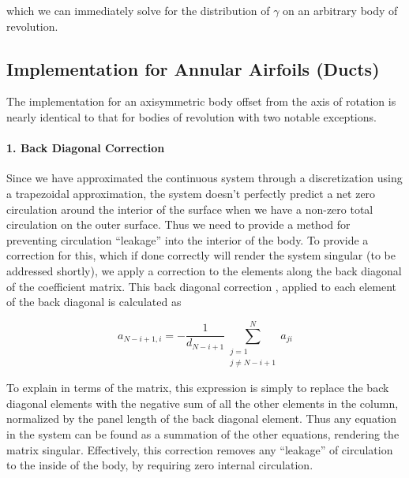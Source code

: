 \noindent which we can immediately solve for the distribution of \(\gamma\) on an arbitrary body of revolution.

\subsection{Implementation for Annular Airfoils (Ducts)}

The implementation for an axisymmetric body offset from the axis of rotation is nearly identical to that for bodies of revolution with two notable exceptions.

\paragraph{1. Back Diagonal Correction}

Since we have approximated the continuous system through a discretization using a trapezoidal approximation, the system doesn't perfectly predict a net zero circulation around the interior of the surface when we have a non-zero total circulation on the outer surface.
Thus we need to provide a method for preventing circulation ``leakage'' into the interior of the body.
To provide a correction for this, which if done correctly will render the system singular (to be addressed shortly), we apply a correction to the elements along the back diagonal of the coefficient matrix.
This back diagonal correction \cite{Lewis_1991}, applied to each element of the back diagonal is calculated as

\begin{equation}
	a_{N-i+1,i} = - \frac{1}{d_{N-i+1}} \sum\limits^N_{\substack{j=1\\ j\neq N-i+1}} a_{ji}
\end{equation}

\noindent To explain in terms of the matrix, this expression is simply to replace the back diagonal elements with the negative sum of all the other elements in the column, normalized by the panel length of the back diagonal element.
Thus any equation in the system can be found as a summation of the other equations, rendering the matrix singular.
Effectively, this correction removes any ``leakage'' of circulation to the inside of the body, by requiring zero internal circulation.

